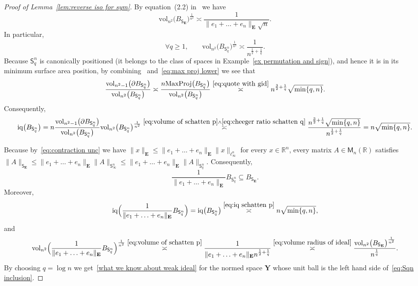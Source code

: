 \documentclass[11pt,reqno]{amsart}
\renewcommand{\le}{\leqslant}
\renewcommand{\ge}{\geqslant}
\newcommand{\Y}{\mathbf Y}
\newcommand{\R}{\mathbb R}
\theoremstyle{remark}
\newcommand{\iq}{\mathrm{iq}}
\newcommand{\M}{\mathsf{M}}
\newcommand{\sfS}{\mathsf{S}}
\renewcommand{\subset}{\subseteq}
\newcommand{\vol}{\mathrm{vol}}
\renewcommand{\1}{\mathbf 1}
\newcommand{\bfE}{\mathbf{E}}
\begin{document}
\begin{proof}[Proof of Lemma~\ref{lem:reverse iso for sym}]   By equation~(2.2) in~\cite{Sch82} we have
\begin{equation}\label{eq:volume radius of ideal}
\vol_{n^2}\big(B_{\sfS_\bfE}\big)^{\frac{1}{n^2}}\asymp \frac{1}{\|e_1+\ldots+e_n\|_\bfE\sqrt{n}}.
\end{equation}
In particular,
\begin{equation}\label{eq:volume of schatten p}
\forall q\ge 1,\qquad \vol_{n^2}\big(B_{\sfS_q^n}\big)^{\frac{1}{n^2}}\asymp \frac{1}{n^{\frac12+\frac{1}{q}}}.
\end{equation}
Because $\sfS_q^n$ is canonically positioned (it belongs to the class of spaces in Example~\ref{ex permutation and sign}), and hence it is in its minimum surface area position, by combining~\cite[Proposition~3.1]{GP99} and~\eqref{eq:max proj lower} we see that
\begin{equation}\label{eq:cheeger ratio schatten q}
\frac{\vol_{n^2-1}\big(\partial B_{\sfS_q^n}\big)}{\vol_{n^2}\big(B_{\sfS_q^n}\big)}\asymp \frac{n\mathrm{MaxProj}\big(B_{\sfS_q^n}\big)}{{\vol_{n^2}\big(B_{\sfS_q^n}\big)}} \stackrel{\eqref{eq:quote with gid}}{\asymp} n^{\frac32+\frac{1}{q}}\sqrt{\min\{q,n\}}.
\end{equation}
Consequently,
\begin{equation}\label{eq:iq schatten p}
\iq\big(B_{\sfS_q^n}\big)= n\frac{\vol_{n^2-1}\big(\partial B_{\sfS_q^n}\big)}{\vol_{n^2}\big(B_{\sfS_q^n}\big)}\vol_{n^2}\big(B_{\sfS_q^n}\big)^{\frac{1}{n^2}}\stackrel{\eqref{eq:volume of schatten p} \wedge \eqref{eq:cheeger ratio schatten q}}{\asymp} \frac{n^{\frac32+\frac{1}{q}}\sqrt{\min\{q,n\}}}{n^{\frac12+\frac{1}{q}}} =n\sqrt{\min\{q,n\}}.
\end{equation}

Because  by~\eqref{eq:contraction unc} we have $\|x\|_\bfE\le \|e_1+\ldots+e_n\|_\bfE \|x\|_{\ell_\infty^n}$ for every $x\in \R^n$, every matrix $A\in \M_n(\R)$ satisfies $\|A\|_{\sfS_\bfE}\le \|e_1+\ldots+e_n\|_{\bfE} \|A\|_{\sfS_\infty^n}\le \|e_1+\ldots+e_n\|_{\bfE} \|A\|_{\sfS_q^n}$. Consequently,
\begin{equation}\label{eq:Sqn inclusion}
\frac{1}{\|e_1+\ldots+e_n\|_{\bfE} }B_{\sfS_q^n}\subset B_{\sfS_\bfE}.
\end{equation}
Moreover,
$$
\iq\Big(\frac{1}{\|e_1+\ldots+e_n\|_{\bfE} }B_{\sfS_q^n}\Big)=\iq\big(B_{\sfS_q^n}\big)\stackrel{\eqref{eq:iq schatten p}}{\asymp}  n\sqrt{\min\{q,n\}},
$$
and
$$
\vol_{n^2}\Big(\frac{1}{\|e_1+\ldots+e_n\|_{\bfE} }B_{\sfS_q^n}\Big)^{\frac{1}{n^2}}\stackrel{\eqref{eq:volume of schatten p}}{\asymp} \frac{1}{\|e_1+\ldots+e_n\|_{\bfE}n^{\frac12+\frac{1}{q}}}\stackrel{\eqref{eq:volume radius of ideal}}{\asymp}  \frac{\vol_{n^2}\big(B_{\sfS_\bfE}\big)^{\frac{1}{n^2}}}{n^{\frac{1}{q}}}.
$$
By choosing $q=\log n$ we get~\eqref{what we know about weak ideal} for the normed space $\Y$ whose unit ball is the left hand side of~\eqref{eq:Sqn inclusion}.\end{proof}
\end{document}

